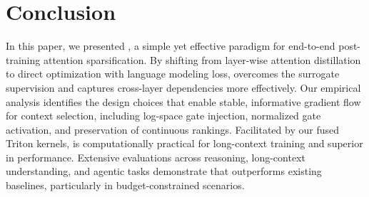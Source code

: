 \section{Conclusion}
\label{sec:conclusion}

In this paper, we presented \our, a simple yet effective paradigm for end-to-end post-training attention sparsification. By shifting from layer-wise attention distillation to direct optimization with language modeling loss, \our overcomes the surrogate supervision and captures cross-layer dependencies more effectively. 
Our empirical analysis identifies the design choices that enable stable, informative gradient flow for context selection, including log-space gate injection, normalized gate activation, and preservation of continuous rankings. Facilitated by our fused Triton kernels, \our is computationally practical for long-context training and superior in performance. 
Extensive evaluations across reasoning, long-context understanding, and agentic tasks demonstrate that \our outperforms existing baselines, particularly in budget-constrained scenarios.
